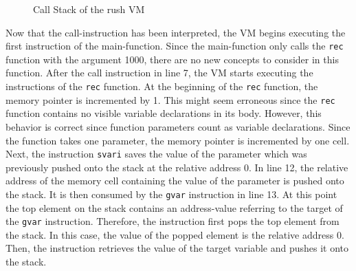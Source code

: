 \begin{figure}
	\centering
	\caption{Call Stack of the rush VM}\label{fig:rush_vm_call_stack}
\end{figure}

Now that the call-instruction has been interpreted, the VM begins executing the first instruction of the main-function.
Since the main-function only calls the \texttt{rec} function with the argument 1000, there are no new concepts to consider in this function.
After the call instruction in line 7, the VM starts executing the instructions of the \texttt{rec} function.
At the beginning of the \texttt{rec} function, the memory pointer is incremented by 1.
This might seem erroneous since the \texttt{rec} function contains no visible variable declarations in its body.
However, this behavior is correct since function parameters count as variable declarations.
Since the function takes one parameter, the memory pointer is incremented by one cell.
Next, the instruction \texttt{svari} saves the value of the parameter which was previously pushed onto the stack at the relative address 0.
In line 12, the relative address of the memory cell containing the value of the parameter is pushed onto the stack.
It is then consumed by the \texttt{gvar} instruction in line 13.
At this point the top element on the stack contains an address-value referring to the target of the \texttt{gvar} instruction.
Therefore, the instruction first pops the top element from the stack.
In this case, the value of the popped element is the relative address 0.
Then, the instruction retrieves the value of the target variable and pushes it onto the stack.

